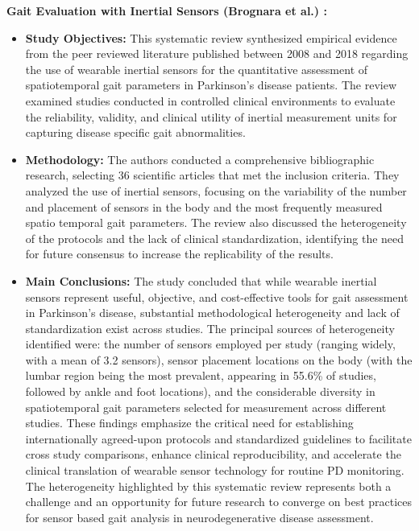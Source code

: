 \documentclass[sigconf,nonacm]{acmart}
\begin{document}
    \textbf{Gait Evaluation with Inertial Sensors (Brognara et al.) \cite{Brognara2019GaitPD}:} 
    \begin{itemize}
        \item \textbf{Study Objectives:} This systematic review synthesized empirical evidence from the peer reviewed literature published between 2008 and 2018 regarding the use of wearable inertial sensors for the quantitative assessment of spatiotemporal gait parameters in Parkinson's disease patients. The review examined studies conducted in controlled clinical environments to evaluate the reliability, validity, and clinical utility of inertial measurement units for capturing disease specific gait abnormalities.
        
        \item \textbf{Methodology:} The authors conducted a comprehensive bibliographic research, selecting 36 scientific articles that met the inclusion criteria. They analyzed the use of inertial sensors, focusing on the variability of the number and placement of sensors in the body and the most frequently measured spatio temporal gait parameters. The review also discussed the heterogeneity of the protocols and the lack of clinical standardization, identifying the need for future consensus to increase the replicability of the results.
        
        \item \textbf{Main Conclusions:} The study concluded that while wearable inertial sensors represent useful, objective, and cost-effective tools for gait assessment in Parkinson's disease, substantial methodological heterogeneity and lack of standardization exist across studies. The principal sources of heterogeneity identified were: the number of sensors employed per study (ranging widely, with a mean of 3.2 sensors), sensor placement locations on the body (with the lumbar region being the most prevalent, appearing in 55.6\% of studies, followed by ankle and foot locations), and the considerable diversity in spatiotemporal gait parameters selected for measurement across different studies. These findings emphasize the critical need for establishing internationally agreed-upon protocols and standardized guidelines to facilitate cross study comparisons, enhance clinical reproducibility, and accelerate the clinical translation of wearable sensor technology for routine PD monitoring. The heterogeneity highlighted by this systematic review represents both a challenge and an opportunity for future research to converge on best practices for sensor based gait analysis in neurodegenerative disease assessment.
        

\end{itemize}
\end{document}
